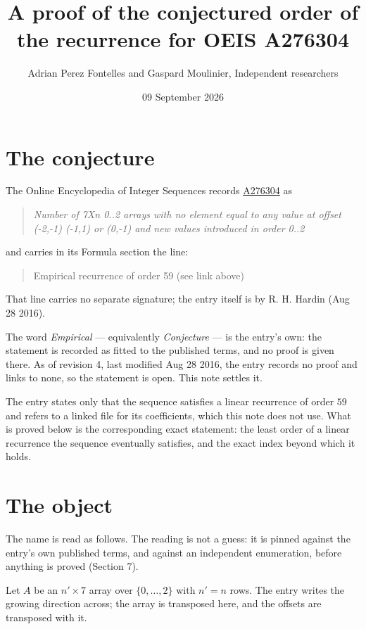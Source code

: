 \documentclass[11pt]{article}
\title{A proof of the conjectured order of the recurrence for OEIS A276304}
\author{Adrian Perez Fontelles and Gaspard Moulinier, Independent researchers}
\date{09 September 2026}
\theoremstyle{definition}
\begin{document}
\maketitle
\section{The conjecture}

The Online Encyclopedia of Integer Sequences records \href{https://oeis.org/A276304}{A276304} as

\begin{quote}\itshape Number of 7Xn 0..2 arrays with no element equal to any value at offset (-2,-1) (-1,1) or (0,-1) and new values introduced in order 0..2\end{quote}

and carries in its Formula section the line:

\begin{quote}\ttfamily Empirical recurrence of order 59 (see link above)\end{quote}

That line carries no separate signature; the entry itself is by R. H. Hardin (Aug 28 2016).

The word {\itshape Empirical} --- equivalently {\itshape Conjecture} --- is the entry's own: the statement is recorded as fitted to the published terms, and no proof is given there. As of revision 4, last modified Aug 28 2016, the entry records no proof and links to none, so the statement is open. This note settles it.

The entry states only that the sequence satisfies a linear recurrence of order $59$ and refers to a linked file for its coefficients, which this note does not use. What is proved below is the corresponding exact statement: the least order of a linear recurrence the sequence eventually satisfies, and the exact index beyond which it holds.

\section{The object}

The name is read as follows. The reading is not a guess: it is pinned against the entry's own published terms, and against an independent enumeration, before anything is proved (Section 7).

Let $A$ be an $n' \times 7$ array over $\{0,\dots,2\}$ with $n' = n$ rows. The entry writes the growing direction across; the array is transposed here, and the offsets are transposed with it.
\end{document}
